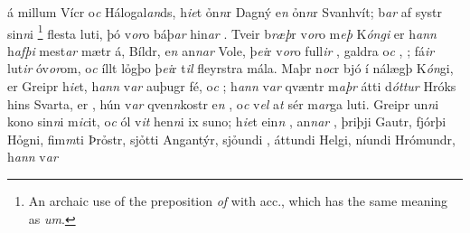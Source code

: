 á millum Vícr
o\textit{c} Hálogal\textit{an}ds, h\textit{ie}t ỏn\textit{n}r Dagný
e\textit{n} ỏn\textit{n}r Svanhvít;   b\textit{ar} af systr sin\textit{n}i  \footnote{An archaic use of the preposition \textit{of} with acc., which has the same meaning as \textit{um}.}  flesta luti, þó v\textit{or}o báþ\textit{ar} hin\textit{ar}  . Tveir b\textit{ræþ}r v\textit{or}o m\textit{eþ} K\textit{óngi} er
h\textit{ann} h\textit{afþi} mest\textit{ar}  mætr  á,   Bíldr, e\textit{n} an\textit{n}\textit{ar} Vole, þ\textit{ei}r v\textit{or}o full\textit{ir} , galdra o\textit{c} ,   ;   fá\textit{ir}  lut\textit{ir}   óv\textit{or}om, o\textit{c} íllt lỏgþo
þ\textit{ei}r t\textit{il} fleyrstra mála.  Maþr n\textit{oc}r bjó í nálægþ K\textit{ón}gi, er Greipr
h\textit{ie}t, h\textit{ann} v\textit{ar}  auþugr   fé, o\textit{c}  ; h\textit{ann} v\textit{ar} qvæntr m\textit{aþr}  átti d\textit{óttur} Hróks hins Svarta, er 
 , 
hún  v\textit{ar} qven\textit{n}kostr e\textit{n} , o\textit{c} v\textit{el} a\textit{t} sér    m\textit{ar}ga luti.  Greipr  un\textit{n}i kono sin\textit{n}i m\textit{ic}it,
o\textit{c}  ól   v\textit{it} hen\textit{n}i ix suno;
h\textit{ie}t ein\textit{n} ,  an\textit{n}\textit{ar} , þriþji Gautr, fjórþi Hỏgni, fim\textit{m}ti Þrỏstr,  sjỏtti
Angantýr, sjỏundi  , áttundi Helgi, níundi  Hrómundr, h\textit{ann} v\textit{ar}
